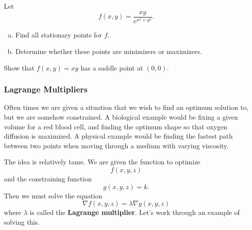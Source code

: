         \begin{exercise}
        Let
        \[
        f(x,y) = \frac{xy}{e^{x^2+y^2}}.
        \]
        \begin{enumerate}[(a)]
            \item Find all stationary points for $f$.
            \item Determine whether these points are minimizers or maximizers.
        \end{enumerate}
        \end{exercise}
        
        \begin{exercise}
        Show that $f(x,y)=xy$ has a saddle point at $(0,0)$.
        \end{exercise}
        
        \subsubsection{Lagrange Multipliers}
        Often times we are given a situation that we wish to find an optimum solution to, but we are somehow constrained.  A biological example would be fixing a given volume for a red blood cell, and finding the optimum shape so that oxygen diffusion is maximized.  A physical example would be finding the fastest path between two points when moving through a medium with varying viscosity.
        
        The idea is relatively tame. We are given the function to optimize
        \[
        f(x,y,z)
        \]
        and the constraining function
        \[
        g(x,y,z)=k.
        \]
        Then we must solve the equation
        \[
        \nabla f(x,y,z) = \lambda \nabla g (x,y,z)
        \]
        where $\lambda$ is called the \textbf{Lagrange multiplier}. Let's work through an example of solving this.
        
